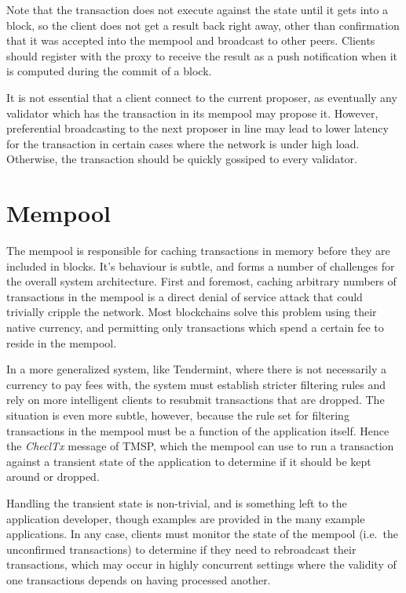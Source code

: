 Note that the transaction does not execute against the state until it gets into a block,
so the client does not get a result back right away, other than confirmation that it was accepted into the mempool and broadcast to other peers.
Clients should register with the proxy to receive the result as a push notification when it is computed during the commit of a block.

It is not essential that a client connect to the current proposer, 
as eventually any validator which has the transaction in its mempool may propose it.
However, preferential broadcasting to the next proposer in line may lead to lower latency for the transaction
in certain cases where the network is under high load. Otherwise, the transaction should be quickly gossiped to every validator.

\section{Mempool}

The mempool is responsible for caching transactions in memory before they are included in blocks.
It's behaviour is subtle, and forms a number of challenges for the overall system architecture.
First and foremost, caching arbitrary numbers of transactions in the mempool is a direct denial of service attack
that could trivially cripple the network. Most blockchains solve this problem using their native currency,
and permitting only transactions which spend a certain fee to reside in the mempool.

In a more generalized system, like Tendermint, where there is not necessarily a currency to pay fees with,
the system must establish stricter filtering rules and rely on more intelligent clients to resubmit transactions that are dropped.
The situation is even more subtle, however, because the rule set for filtering transactions in the mempool must be a function of the application itself.
Hence the \emph{CheclTx} message of TMSP,
which the mempool can use to run a transaction against a transient state of the application to determine if it should be kept around or dropped.

Handling the transient state is non-trivial, and is something left to the application developer, 
though examples are provided in the many example applications. 
In any case, clients must monitor the state of the mempool (i.e.~the unconfirmed transactions) to determine if they need to rebroadcast their transactions,
which may occur in highly concurrent settings where the validity of one transactions depends on having processed another.


